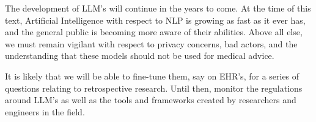 The development of LLM's will continue in the years to come. At the time of this text, Artificial Intelligence with respect to NLP is growing as fast as it ever has, and the general public is becoming more aware of their abilities. Above all else, we
must remain vigilant with respect to privacy concerns, bad actors, and the understanding that these models should not be used for medical advice.

It is likely that we will be able to fine-tune them, say on EHR's, for a series of questions relating to retrospective research. Until then, monitor the regulations around LLM's as well as the tools and frameworks created by researchers and engineers in the field.
